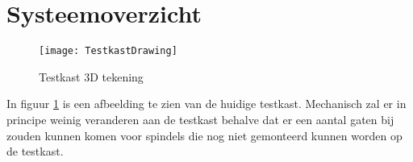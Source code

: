 \section{Systeemoverzicht}

\begin{figure}[H]
	\centering
	\texttt{[image: TestkastDrawing]}
	\label{fig:TestkastDrawing}
	\caption{Testkast 3D tekening}
\end{figure}

In figuur \ref{fig:TestkastDrawing} is een afbeelding te zien van de huidige testkast. Mechanisch zal er in principe weinig veranderen aan de testkast behalve dat er een aantal gaten bij zouden kunnen komen voor spindels die nog niet gemonteerd kunnen worden op de testkast.

